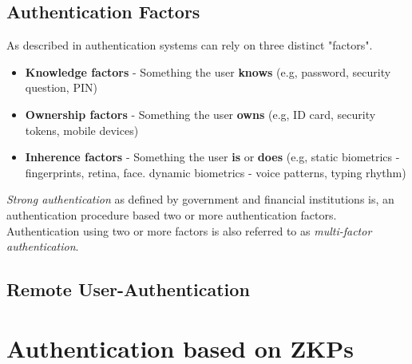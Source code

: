 \subsection{Authentication Factors}

As described in \cite{council2005authentication} authentication systems can rely on three distinct "factors".

\begin{itemize}
	\item \textbf{Knowledge factors} - Something the user \textbf{knows} (e.g, password, security question, PIN)
	\item \textbf{Ownership factors} - Something the user \textbf{owns} (e.g, ID card, security tokens, mobile devices)
	\item \textbf{Inherence factors} - Something the user \textbf{is} or \textbf{does} (e.g, static biometrics - fingerprints, retina, face. dynamic biometrics - voice patterns, typing rhythm)
\end{itemize}

\textit{Strong authentication} as defined by government and financial institutions is, an authentication procedure based two or more authentication factors. Authentication using two or more factors is also referred to as \textit{multi-factor authentication}.

\subsection{Remote User-Authentication}

\section{Authentication based on ZKPs}


%
%
%
